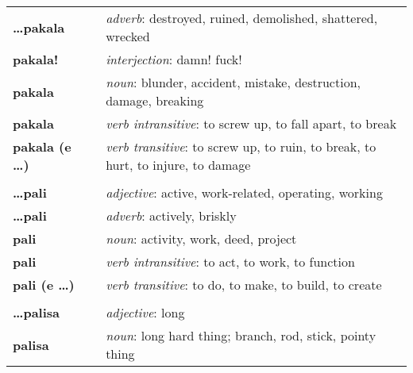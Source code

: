 \begin{supertabular}{p{2,5cm}|ll}
    \textbf{\dots pakala}        &  & \textit{adverb}: destroyed, ruined, demolished, shattered, wrecked                                         \\
    \textbf{pakala!}             &  & \textit{interjection}: damn! fuck!                                                                         \\
    \textbf{pakala}              &  & \textit{noun}: blunder, accident, mistake, destruction, damage, breaking                                   \\
    \textbf{pakala}              &  & \textit{verb intransitive}: to screw up, to fall apart, to break                                           \\
    \textbf{pakala (e \dots)}    &  & \textit{verb transitive}: to screw up, to ruin, to break, to hurt, to injure, to damage                    \\
                                 &  &                                                                                                            \\ %
    \textbf{\dots pali}          &  & \textit{adjective}: active, work-related, operating, working                                               \\
    \textbf{\dots pali}          &  & \textit{adverb}: actively, briskly                                                                         \\
    \textbf{pali}                &  & \textit{noun}: activity, work, deed, project                                                               \\
    \textbf{pali}                &  & \textit{verb intransitive}: to act, to work, to function                                                   \\
    \textbf{pali (e \dots)}      &  & \textit{verb transitive}: to do, to make, to build, to create                                              \\
                                 &  &                                                                                                            \\ %
    \textbf{\dots palisa}        &  & \textit{adjective}: long                                                                                   \\
    \textbf{palisa}              &  & \textit{noun}: long hard thing; branch, rod, stick, pointy thing                                           \\

\end{supertabular}
